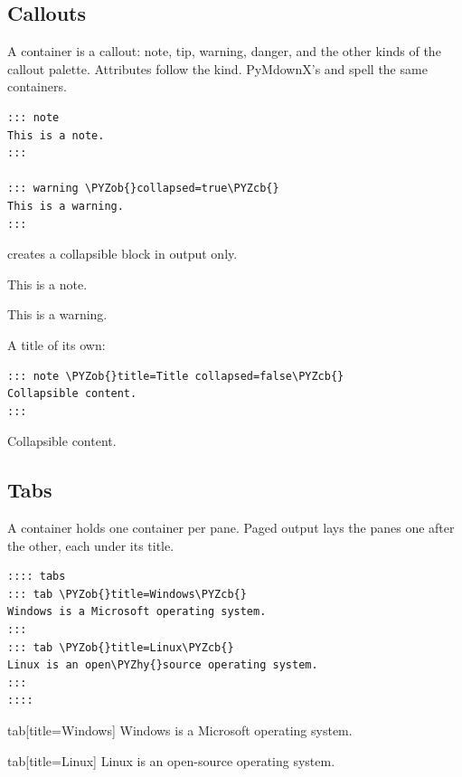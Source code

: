 \documentclass[a4paper,twoside]{article}
\begin{document}
\subsection{Callouts}
A  container is a callout: note, tip, warning, danger, and the other kinds of the callout palette. Attributes follow the kind. PyMdownX's  and  spell the same containers.
\begin{tscode}[lang=md, engine=pygments]
\begin{Verbatim}[commandchars=\\\{\},breaklines, breakanywhere, commandchars=\\\{\}]
::: note
This is a note.
:::

::: warning \PYZob{}collapsed=true\PYZcb{}
This is a warning.
:::
\end{Verbatim}
\end{tscode}
 creates a collapsible block in  output only.
\begin{tscallout}[kind=note]
This is a note.
\end{tscallout}
\begin{tscallout}[kind=warning, collapsed]
This is a warning.
\end{tscallout}
A title of its own:
\begin{tscode}[lang=md, engine=pygments]
\begin{Verbatim}[commandchars=\\\{\},breaklines, breakanywhere, commandchars=\\\{\}]
::: note \PYZob{}title=Title collapsed=false\PYZcb{}
Collapsible content.
:::
\end{Verbatim}
\end{tscode}
\begin{displayquote}
\begin{tscallout}[kind=note, title={Title}]
Collapsible content.
\end{tscallout}
\end{displayquote}
\subsection{Tabs}
A  container holds one  container per pane. Paged output lays the panes one after the other, each under its title.
\begin{tscode}[lang=md, engine=pygments]
\begin{Verbatim}[commandchars=\\\{\},breaklines, breakanywhere, commandchars=\\\{\}]
:::: tabs
::: tab \PYZob{}title=Windows\PYZcb{}
Windows is a Microsoft operating system.
:::
::: tab \PYZob{}title=Linux\PYZcb{}
Linux is an open\PYZhy{}source operating system.
:::
::::
\end{Verbatim}
\end{tscode}
\begin{tsdiv}{tab}[title=Windows]
Windows is a Microsoft operating system.
\end{tsdiv}
\begin{tsdiv}{tab}[title=Linux]
Linux is an open-source operating system.
\end{tsdiv}
\end{document}
